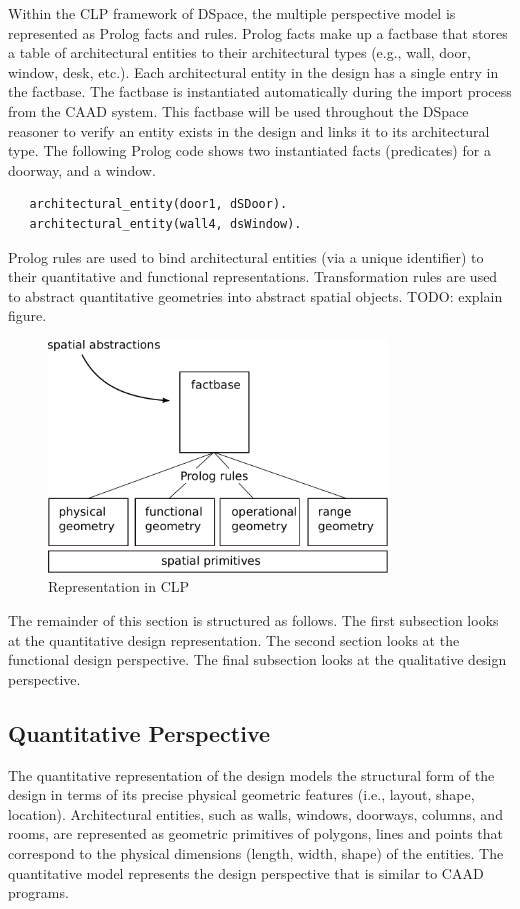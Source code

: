 \documentclass[12pt]{ucthesis}
\begin{document}
Within the CLP framework of DSpace, the multiple perspective model is represented as Prolog facts and rules. Prolog facts make up a factbase that stores a table of architectural entities to their architectural types (e.g., wall, door, window, desk, etc.). Each architectural entity in the design has a single entry in the factbase. The factbase is instantiated automatically during the import process from the CAAD system. This factbase will be used throughout the DSpace reasoner to  verify an entity exists in the design and links it to its architectural type. The following Prolog code shows two instantiated facts (predicates) for a doorway, and a window. 
\begin{verbatim}
   architectural_entity(door1, dSDoor).
   architectural_entity(wall4, dsWindow).
\end{verbatim}

Prolog rules are used to bind architectural entities (via a unique identifier) to their quantitative and functional representations. Transformation rules are used to abstract quantitative geometries into abstract spatial objects. TODO: explain figure. 

\begin{figure}[H]
\centering
\includegraphics[width=90mm]{clp-design}
\caption{Representation in CLP}
\label{clp-design}
\end{figure}

The remainder of this section is structured as follows. The first subsection looks at the quantitative design representation. The second section looks at the functional design perspective. The final subsection looks at the qualitative design perspective.


\subsection{Quantitative Perspective}
The quantitative representation of the design models the structural form of the design in terms of its precise physical geometric features (i.e., layout, shape, location). Architectural entities, such as walls, windows, doorways, columns, and rooms, are represented as geometric primitives of polygons, lines and points that correspond to the physical dimensions (length, width, shape) of the entities. The quantitative model represents the design perspective that is similar to CAAD programs.
\end{document}
